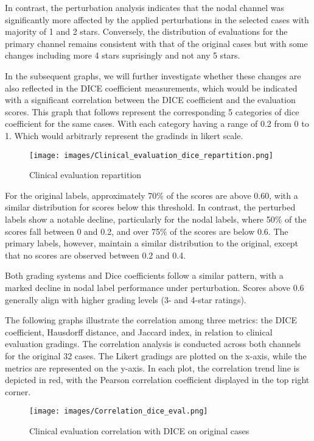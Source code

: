 In contrast, the perturbation analysis indicates that the nodal channel was significantly more affected by the applied perturbations in the selected cases with majority of 1 and 2 stars. Conversely, the distribution of evaluations for the primary channel remains consistent with that of the original cases but with some changes including more 4 stars suprisingly and not any 5 stars.

In the subsequent graphs, we will further investigate whether these changes are also reflected in the DICE coefficient measurements, which would be indicated with a significant correlation between the DICE coefficient and the evaluation scores.
\newpage
This graph that follows represent the corresponding 5 categories of dice coefficient for the same cases. With each category having a range of 0.2 from 0 to 1.
Which would arbitrarly represent the gradinds in likert scale.
\begin{figure}[ht]
    \centering
    \texttt{[image: images/Clinical\_evaluation\_dice\_repartition.png]}
    \caption{Clinical evaluation repartition}
    \label{fig:three_subfigures}
\end{figure}

For the original labels, approximately 70\% of the scores are above 0.60, with a similar distribution for scores below this threshold. In contrast, the perturbed labels show a notable decline, particularly for the nodal labels, where 50\% of the scores fall between 0 and 0.2, and over 75\% of the scores are below 0.6. The primary labels, however, maintain a similar distribution to the original, except that no scores are observed between 0.2 and 0.4.

Both grading systems and Dice coefficients follow a similar pattern, with a marked decline in nodal label performance under perturbation. Scores above 0.6 generally align with higher grading levels (3- and 4-star ratings).

\newpage
The following graphs illustrate the correlation among three metrics: the DICE coefficient, Hausdorff distance, and Jaccard index, 
in relation to clinical evaluation gradings. The correlation analysis is conducted across both channels for the original 32 cases. 
The Likert gradings are plotted on the x-axis, while the metrics are represented on the y-axis. In each plot, the correlation trend 
line is depicted in red, with the Pearson correlation coefficient displayed in the top right corner.

\begin{figure}[ht]
    \centering
    \texttt{[image: images/Correlation\_dice\_eval.png]}
    \caption{Clinical evaluation correlation with DICE on original cases}
    \label{fig:three_subfigures}
\end{figure}

